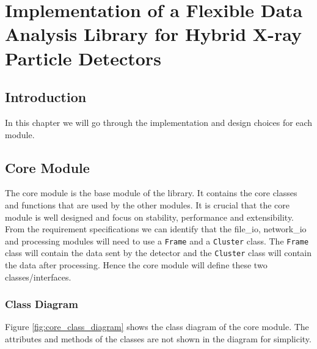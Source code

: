
\setcounter{chapter}{2}
\chapter{Implementation of a Flexible Data Analysis Library for Hybrid X-ray Particle Detectors }
\minitoc %
\graphicspath{{Chapitre3/figures/}}

\pagestyle{fancy}
\fancyhf{}
\fancyhead[R]{\bfseries\rightmark}
\fancyfoot[R]{\thepage}
\renewcommand{\headrulewidth}{0.5pt}
\renewcommand{\footrulewidth}{0pt}
\renewcommand{\chaptermark}[1]{\markboth{{\chaptername~\thechapter. #1 }}{}}
\renewcommand{\sectionmark}[1]{\markright{\thechapter.\thesection~ #1}}

\begin{spacing}{1.2}

    \section*{Introduction}
    In this chapter we will go through the implementation and design choices for each module.




    \section{Core Module}
    The core module is the base module of the library. It contains the core classes and functions
    that are used by the other modules. It is crucial that the core module is well designed and
    focus on stability, performance and extensibility. From the requirement specifications we can
    identify that the file\_io, network\_io and processing modules will need to use a \lstinline|Frame| and a
    \lstinline|Cluster| class. The \lstinline|Frame| class will contain the data sent by the detector and the \lstinline|Cluster| class
    will contain the data after processing. Hence the core module will define these two classes/interfaces.\\

    \subsection{Class Diagram}
    Figure \ref{fig:core_class_diagram} shows the class diagram of the core module. The attributes
    and methods of the classes are not shown in the diagram for simplicity.


\end{spacing}
